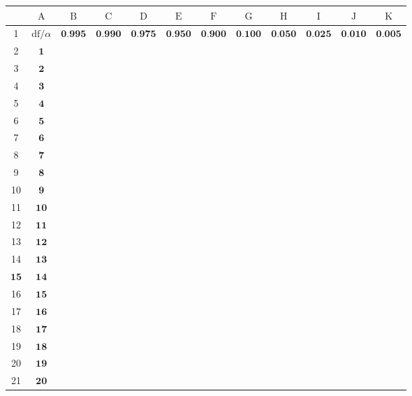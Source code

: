 \documentclass[10pt]{article}
\begin{document}
\begin{CJK*}{UTF8}{bsmi}
\begin{center}
\begin{tabular}{|c|c|c|c|c|c|c|c|c|c|c|c|}
\hline
 & $\mathrm{A}$ & $\mathrm{B}$ & $\mathrm{C}$ & $\mathrm{D}$ & $\mathrm{E}$ & $\mathrm{F}$ & $\mathrm{G}$ & $\mathrm{H}$ & $\mathrm{I}$ & $\mathrm{J}$ & $\mathrm{K}$ \\
\hline
1 & $\mathrm{df} / \alpha$ & $\mathbf{0 . 9 9 5}$ & $\mathbf{0 . 9 9 0}$ & $\mathbf{0 . 9 7 5}$ & $\mathbf{0 . 9 5 0}$ & $\mathbf{0 . 9 0 0}$ & $\mathbf{0 . 1 0 0}$ & $\mathbf{0 . 0 5 0}$ & $\mathbf{0 . 0 2 5}$ & $\mathbf{0 . 0 1 0}$ & $\mathbf{0 . 0 0 5}$ \\
\hline
2 & $\mathbf{1}$ &  &  &  &  &  &  &  &  &  &  \\
\hline
3 & $\mathbf{2}$ &  &  &  &  &  &  &  &  &  &  \\
\hline
4 & $\mathbf{3}$ &  &  &  &  &  &  &  &  &  &  \\
\hline
5 & $\mathbf{4}$ &  &  &  &  &  &  &  &  &  &  \\
\hline
6 & $\mathbf{5}$ &  &  &  &  &  &  &  &  &  &  \\
\hline
7 & $\mathbf{6}$ &  &  &  &  &  &  &  &  &  &  \\
\hline
8 & $\mathbf{7}$ &  &  &  &  &  &  &  &  &  &  \\
\hline
9 & $\mathbf{8}$ &  &  &  &  &  &  &  &  &  &  \\
\hline
10 & $\mathbf{9}$ &  &  &  &  &  &  &  &  &  &  \\
\hline
11 & $\mathbf{1 0}$ &  &  &  &  &  &  &  &  &  &  \\
\hline
12 & $\mathbf{1 1}$ &  &  &  &  &  &  &  &  &  &  \\
\hline
13 & $\mathbf{1 2}$ &  &  &  &  &  &  &  &  &  &  \\
\hline
14 & $\mathbf{1 3}$ &  &  &  &  &  &  &  &  &  &  \\
\hline
$\mathbf{1 5}$ & $\mathbf{1 4}$ &  &  &  &  &  &  &  &  &  &  \\
\hline
16 & $\mathbf{1 5}$ &  &  &  &  &  &  &  &  &  &  \\
\hline
17 & $\mathbf{1 6}$ &  &  &  &  &  &  &  &  &  &  \\
\hline
18 & $\mathbf{1 7}$ &  &  &  &  &  &  &  &  &  &  \\
\hline
19 & $\mathbf{1 8}$ &  &  &  &  &  &  &  &  &  &  \\
\hline
20 & $\mathbf{1 9}$ &  &  &  &  &  &  &  &  &  &  \\
\hline
21 & $\mathbf{2 0}$ &  &  &  &  &  &  &  &  &  &  \\
\hline
\end{tabular}
\end{center}


\end{CJK*}
\end{document}
